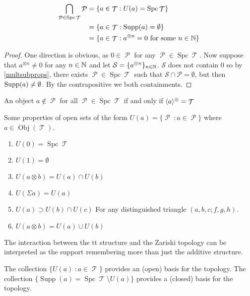 \documentclass[11pt]{article}
\DeclareMathOperator{\ob}{Obj}
\DeclareMathOperator{\TT}{\mathcal{T}}
\DeclareMathOperator{\cP}{\mathcal{P}}
\DeclareMathOperator{\supp}{Supp}
\DeclareMathOperator{\spc}{Spc}
\begin{document}
\begin{cor}
	\begin{align*}
		\bigcap_{\cP \in \spc \TT} \cP &= \{a \in \TT: U(a) = \spc \TT\}\\
				&= \{a \in \TT: \Supp(a) = \emptyset\}\\
				&= \{a \in \TT: a^{\otimes n} = 0 \text{ for some } n \in \N\}
	\end{align*}
\end{cor}
\begin{proof}
One direction is obvious, as $0 \in \cP$ for any $\cP \in \spc \TT$. Now suppose that $a^{\otimes n} \not = 0$ for any $n \in \mathbb N$ and let $\mathcal{S} = \{a^{\otimes n}\}_{n \in \mathbb N}$. $\mathcal{S}$ does not contain $0$ so by \autoref{multsubprops}, there exists $\cP \in \spc \TT$ such that $\mathcal{S} \cap \mathcal{P} = \emptyset$, but then $\operatorname{Supp}(a) \not = \emptyset$. By the contrapositive we both containments.
\end{proof}

\begin{cor} An object $a \not\in \cP$ for all $\cP \in \spc \TT$ if and only if $\la a \ra^{\otimes} = \TT$

\end{cor}

\begin{prop} Some properties of open sets of the form $U(a) = \{\cP \ : a \in \cP\}$ where $a \in \ob(\TT)$.
\begin{enumerate}
    \item $U(0) = \spc\TT$
    \item $U(1) = \emptyset$
    \item $U(a\otimes b) = U(a) \cap U(b)$
    \item $U(\Sigma a) = U(a)$
    \item $U(a) \supset U(b) \cap U(c)$ For any distinguished triangle $(a,b,c; f,g,h)$.
    \item $U(a\otimes b) = U(a) \cup U(b)$
\end{enumerate}
\end{prop}

\begin{rmk} The interaction between the tt structure and the Zariski topology can be interpreted as the support remembering more than just the additive structure.
\end{rmk}

\begin{cor} The collection $\{U(a)\ : a \in \TT\}$ provides an (open) basis for the topology. The collection $\{\supp(a) = \spc\TT\setminus U(a)\}$ provides a (closed) basis for the topology.
\end{cor}
\end{document}
